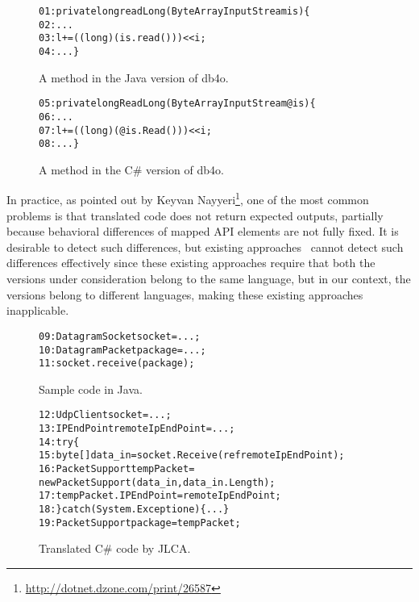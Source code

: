 \begin{figure}[t]
\begin{CodeOut}%
\begin{alltt}
01: private long readLong(ByteArrayInputStream is)\{
02:  ...
03:  l += ((long) (is.read())) << i;
04: ...\}
\end{alltt}
\end{CodeOut}\vspace*{-4ex}
\caption{A method in the Java version of db4o.}\vspace*{-2ex}
\label{fig:db4ojava}
\begin{CodeOut}%
\begin{alltt}
05: private long ReadLong(ByteArrayInputStream @is)\{
06:  ...
07:  l += ((long)(@is.Read())) << i;
08:  ...\}
\end{alltt}
\end{CodeOut}\vspace*{-4ex}
\caption{A method in the C\# version of db4o.}\vspace*{-2ex}
\label{fig:db40net}
\end{figure}

In practice, as pointed out by Keyvan Nayyeri\footnote{\url{http://dotnet.dzone.com/print/26587}}, one of the most common problems is that translated code does not return expected outputs, partially because behavioral differences of mapped API elements are not fully fixed. It is desirable to detect such differences, but existing approaches~\cite{orso1using,jin2010automated} cannot detect such differences effectively since these existing approaches require that both the versions under consideration belong to the same language, but in our context, the versions belong to different languages, making these existing approaches inapplicable.
\begin{figure}[t]
\begin{CodeOut}%
\begin{alltt}
09: DatagramSocket socket = ...;
10: DatagramPacket package = ...;
11: socket.receive(package);
\end{alltt}
\end{CodeOut}\vspace*{-5ex}
\caption{Sample code in Java.}\vspace*{-2ex}
\label{fig:javacode}
\begin{CodeOut}%
\begin{alltt}
12: UdpClient socket = ...;
13: IPEndPoint remoteIpEndPoint = ...;
14: try\{
15:  byte[] data_in = socket.Receive(ref remoteIpEndPoint);
16:  PacketSupport tempPacket =
          new PacketSupport(data_in, data_in.Length);
17:   tempPacket.IPEndPoint = remoteIpEndPoint;
18: \} catch (System.Exception e)\{...\}
19: PacketSupport package = tempPacket;
\end{alltt}
\end{CodeOut}\vspace*{-5ex}
\caption{Translated C\# code by JLCA.}\vspace*{-2ex}
\label{fig:codeJLCA}
\end{figure}


